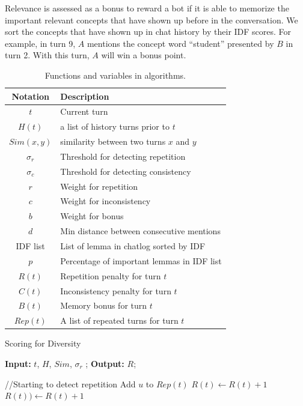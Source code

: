 Relevance is assessed as a bonus to reward
a bot if it is able to memorize the important relevant concepts that have shown up 
before in the conversation. We sort the concepts that have shown up in 
chat history by their IDF scores. For example, in turn 9, $A$ 
mentions the concept word ``student'' presented by $B$ in turn 2. With this
turn, $A$ will win a bonus point.


\begin{table}[th]
\centering
\scriptsize
\begin{tabular}{c|l}
\toprule
\textbf{Notation} & \textbf{Description} \\ \midrule
$t$ & Current turn \\
$H(t)$  &  a list of history turns prior to $t$ \\
$Sim(x,y)$ & similarity between two turns $x$ and $y$ \\
$\sigma_r$ & Threshold for detecting repetition \\
$\sigma_c$ & Threshold for detecting consistency \\
$r$ & Weight for repetition \\
$c$ & Weight for inconsistency \\
$b$ & Weight for bonus \\
$d$ & Min distance between consecutive mentions \\
IDF list & List of lemma in chatlog sorted by IDF\\
$p$ & Percentage of important lemmas in IDF list\\
$R(t)$ &  Repetition penalty for turn $t$ \\
$C(t)$ &  Inconsistency penalty for turn $t$ \\ 
$B(t)$ &  Memory bonus for turn $t$ \\
$Rep(t)$ & A list of repeated turns for turn $t$ \\  
\bottomrule
\end{tabular}
\caption{
Functions and variables in algorithms.}
\label{tab:functions}
\end{table}

\begin{algorithm}[th]
\small
\caption{Scoring for Diversity}
\label{algo:rep}
\hspace*{0.02in} {\bf Input:}
 $t$, $H$, $Sim$, $\sigma_{r}$
; \hspace*{0.02in} {\bf Output: } 
 $R$;
\begin{algorithmic}[1]
\State //Starting to detect repetition
		\State Add $u$ to $Rep(t)$
	\EndIf
\EndFor
        \State $ R(t) \leftarrow  R(t) + 1$ 
        \Else
        \State $R(t)) \leftarrow R(t) + 1$ 
        \EndIf
        \EndIf
    \EndIf
\end{algorithmic}
\end{algorithm}


